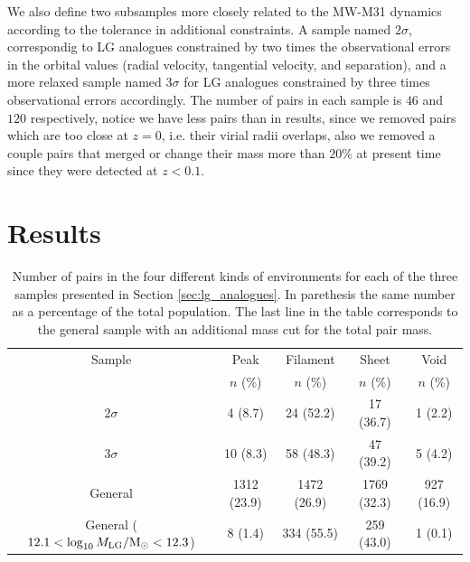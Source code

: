 \documentclass{emulateapj}
\newcommand{\Msun}{{\ifmmode{{\rm {M_{\odot}}}}\else{${\rm{M_{\odot}}}$}\fi}}
\begin{document}
We also define two subsamples more closely related to the MW-M31 
dynamics according to the tolerance in additional constraints.
A sample named $2\sigma$, correspondig to LG analogues constrained by
two times the observational errors in the orbital values (radial
velocity, tangential velocity, and separation), and a more relaxed
sample named $3\sigma$ for LG analogues constrained by three times
observational errors accordingly. 
The number of pairs in each sample is $46$ and $120$ respectively,
notice we have less pairs than in \citet{lganalogues} results, since
we removed pairs which are too close at $z=0$, i.e. their virial radii
overlaps, also we removed a couple pairs that merged or change their
mass more than $20\%$ at present time since they were detected at
$z<0.1$. 


\section{Results}
\label{sec:results}

\begin{table}
\begin{center}
\begin{tabular}{ccccc}\hline\hline
Sample & Peak & Filament & Sheet & Void\\
       & $n$ (\%) & $n$ (\%) & $n$ (\%) & $n$ (\%) \\\hline
2$\sigma$ & 4 (8.7) & 24 (52.2) &  17 (36.7) & 1 (2.2)\\
3$\sigma$ & 10 (8.3) & 58 (48.3) & 47 (39.2) & 5 (4.2)\\  
General & 1312 (23.9) & 1472 (26.9) & 1769 (32.3) & 927 (16.9)\\
General ($12.1<\log_{10} M_{\rm LG}/\Msun<12.3$)& 8 (1.4) & 334 (55.5) & 259
(43.0) & 1 (0.1)\\
\hline\hline
\end{tabular}
\caption{
Number of pairs in the four different kinds of environments for each
of the three samples presented in Section \ref{sec:lg_analogues}. 
In parethesis the same number as a percentage of the total population.
The last line in the table corresponds to the general sample with an
additional mass cut for the total pair mass.  
\label{table:web_type}}
\end{center}
\end{table}
\end{document}
